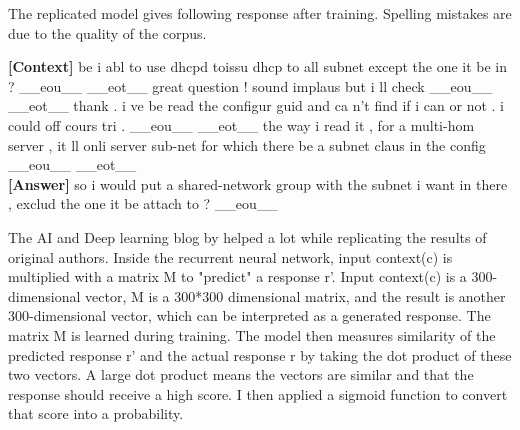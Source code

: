 \documentclass[letterpaper] {article} %
\begin{document}
The replicated model gives following response after training. Spelling mistakes are due to the quality of the corpus.
\begin{tcolorbox}
     \textbf{[Context]} be i abl to use dhcpd toissu dhcp to all subnet except the one it be in ? \_\_eou\_\_ \_\_eot\_\_ great question ! sound implaus but i ll check \_\_eou\_\_ \_\_eot\_\_ thank . i ve be read the configur guid and ca n't find if i can or not . i could off cours tri . \_\_eou\_\_ \_\_eot\_\_ the way i read it , for a multi-hom server , it ll onli server sub-net for which there be a subnet { } claus in the config \_\_eou\_\_ \_\_eot\_\_ \\
     \textbf{[Answer]} so i would put a shared-network group with the subnet i want in there , exclud the one it be attach to ? \_\_eou\_\_
\end{tcolorbox}
The AI and Deep learning blog by \cite{DENNYBRITZ} helped a lot while replicating the results of original authors. Inside the recurrent neural network, input context(c) is multiplied with a matrix M to "predict" a response r'. Input context(c) is a 300-dimensional vector, M is a 300*300 dimensional matrix, and the result is another 300-dimensional vector, which can be interpreted as a generated response. The matrix M is learned during training. The model then measures similarity of the predicted response r' and the actual response r by taking the dot product of these two vectors. A large dot product means the vectors are similar and that the response should receive a high score. I then applied a sigmoid function to convert that score into a probability.
\end{document}
